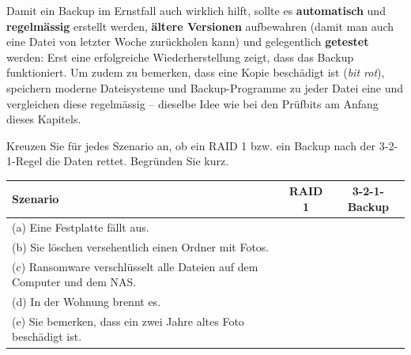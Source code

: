 Damit ein Backup im Ernstfall auch wirklich hilft, sollte es \textbf{automatisch} und \textbf{regelmässig} erstellt werden, \textbf{ältere Versionen} aufbewahren (damit man auch eine Datei von letzter Woche zurückholen kann) und gelegentlich \textbf{getestet} werden: Erst eine erfolgreiche Wiederherstellung zeigt, dass das Backup funktioniert. Um zudem zu bemerken, dass eine Kopie beschädigt ist (\textit{bit rot}), speichern moderne Dateisysteme und Backup-Programme zu jeder Datei eine  und vergleichen diese regelmässig -- dieselbe Idee wie bei den Prüfbits am Anfang dieses Kapitels.

\begin{myexercise}
    Kreuzen Sie für jedes Szenario an, ob ein \gls{RAID} 1 bzw. ein Backup nach der 3-2-1-Regel die Daten rettet. Begründen Sie kurz.

    \begin{table}[H]
        \centering
        \begin{tabular}{p{7.2cm}cc}
            \textbf{Szenario}                                                        & \textbf{\acrshort{RAID} 1} & \textbf{3-2-1-Backup} \\\midrule
            (a) Eine Festplatte fällt aus.                                           &                            &                       \\\midrule
            (b) Sie löschen versehentlich einen Ordner mit Fotos.                    &                            &                       \\\midrule
            (c) Ransomware verschlüsselt alle Dateien auf dem Computer und dem \acrshort{NAS}. &              &                       \\\midrule
            (d) In der Wohnung brennt es.                                            &                            &                       \\\midrule
            (e) Sie bemerken, dass ein zwei Jahre altes Foto beschädigt ist.         &                            &                       \\
        \end{tabular}
    \end{table}


\end{myexercise}
